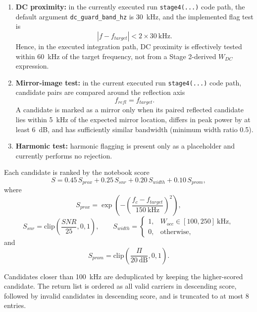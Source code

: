 \documentclass[11pt]{article}
\begin{document}
\begin{enumerate}
\item \textbf{DC proximity:} in the currently executed run \texttt{stage4(...)} code path, the default argument \texttt{dc\_guard\_band\_hz} is 30~kHz, and the implemented flag test is
\begin{equation}
|f - f_{target}| < 2 \times 30~\text{kHz}.
\end{equation}
Hence, in the executed integration path, DC proximity is effectively tested within 60~kHz of the target frequency, not from a Stage 2-derived $W_{DC}$ expression.

\item \textbf{Mirror-image test:} in the current executed run \texttt{stage4(...)} code path, candidate pairs are compared around the reflection axis
\begin{equation}
f_{refl} = f_{target}.
\end{equation}
A candidate is marked as a mirror only when its paired reflected candidate lies within 5~kHz of the expected mirror location, differs in peak power by at least 6~dB, and has sufficiently similar bandwidth (minimum width ratio 0.5).

\item \textbf{Harmonic test:} harmonic flagging is present only as a placeholder and currently performs no rejection.
\end{enumerate}

Each candidate is ranked by the notebook score
\begin{equation}
S = 0.45\, S_{prox} + 0.25\, S_{snr} + 0.20\, S_{width} + 0.10\, S_{prom},
\end{equation}
where
\begin{equation}
S_{prox} = \exp\left(-\left(\frac{f_c - f_{target}}{150~\text{kHz}}\right)^2\right),
\end{equation}
\begin{equation}
S_{snr} = \text{clip}\left(\frac{SNR}{25}, 0, 1\right), \qquad
S_{width} = \begin{cases} 1, & W_{occ} \in [100, 250]~\text{kHz}, \\ 0, & \text{otherwise}, \end{cases}
\end{equation}
and
\begin{equation}
S_{prom} = \text{clip}\left(\frac{\Pi}{20~\text{dB}}, 0, 1\right).
\end{equation}

Candidates closer than 100~kHz are deduplicated by keeping the higher-scored candidate. The return list is ordered as all valid carriers in descending score, followed by invalid candidates in descending score, and is truncated to at most 8 entries.
\end{document}
